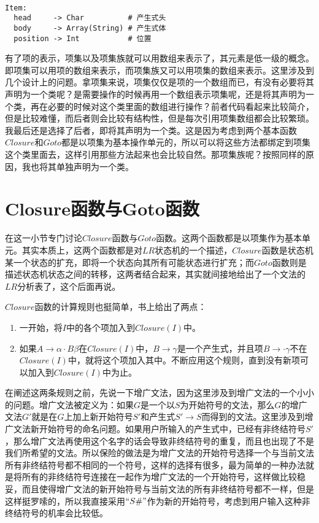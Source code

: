 \begin{verbatim}

Item:
  head     -> Char          # 产生式头
  body     -> Array(String) # 产生式体
  position -> Int           # 位置
\end{verbatim}

有了项的表示，项集以及项集族就可以用数组来表示了，其元素是低一级的概念。即项集可以用项的数组来表示，而项集族又可以用项集的数组来表示。这里涉及到几个设计上的问题。拿项集来说，项集仅仅是项的一个数组而已，有没有必要将其声明为一个类呢？是需要操作的时候再用一个数组表示项集呢，还是将其声明为一个类，再在必要的时候对这个类里面的数组进行操作？前者代码看起来比较简介，但是比较难懂，而后者则会比较有结构性，但是每次引用项集数组都会比较繁琐。我最后还是选择了后者，即将其声明为一个类。这是因为考虑到两个基本函数$Closure$和$Goto$都是以项集为基本操作单元的，所以可以将这些方法都绑定到项集这个类里面去，这样引用那些方法起来也会比较自然。那项集族呢？按照同样的原因，我也将其单独声明为一个类。

\section{Closure函数与Goto函数}

在这一小节专门讨论$Closure$函数与$Goto$函数。这两个函数都是以项集作为基本单元。其实本质上，这两个函数都是对$LR$状态机的一个描述，$Closure$函数是状态机某一个状态的扩充，即将一个状态向其所有可能状态进行扩充；而$Goto$函数则是描述状态机状态之间的转移，这两者结合起来，其实就间接地给出了一个文法的$LR$分析表了，这个后面再说。

$Closure$函数的计算规则也挺简单，书上给出了两点：

\begin{enumerate}
    \item 一开始，将$I$中的各个项加入到$Closure(I)$中。
    \item 如果$A \rightarrow \alpha \cdot B \beta$在$Closure(I)$中，$B \rightarrow \gamma$是一个产生式，并且项$B \rightarrow \cdot \gamma$不在$Closure(I)$中，就将这个项加入其中。不断应用这个规则，直到没有新项可以加入到$Closure(I)$中为止。
\end{enumerate}

在阐述这两条规则之前，先说一下增广文法，因为这里涉及到增广文法的一个小小的问题。增广文法被定义为：如果$G$是一个以$S$为开始符号的文法，那么$G$的增广文法$G'$就是在$G$上加上新开始符号$S'$和产生式$S' \rightarrow S$而得到的文法。这里涉及到增广文法新开始符号的命名问题。如果用户所输入的产生式中，已经有非终结符号$S'$，那么增广文法再使用这个名字的话会导致非终结符号的重复，而且也出现了不是我们所希望的文法。所以保险的做法是为增广文法的开始符号选择一个与当前文法所有非终结符号都不相同的一个符号，这样的选择有很多，最为简单的一种办法就是将所有的非终结符号连接在一起作为增广文法的一个开始符号，这样做比较稳妥，而且使得增广文法的新开始符号与当前文法的所有非终结符号都不一样，但是这样挺罗嗦的，所以我直接采用$``S\#"$作为新的开始符号，考虑到用户输入这种非终结符号的机率会比较低。

